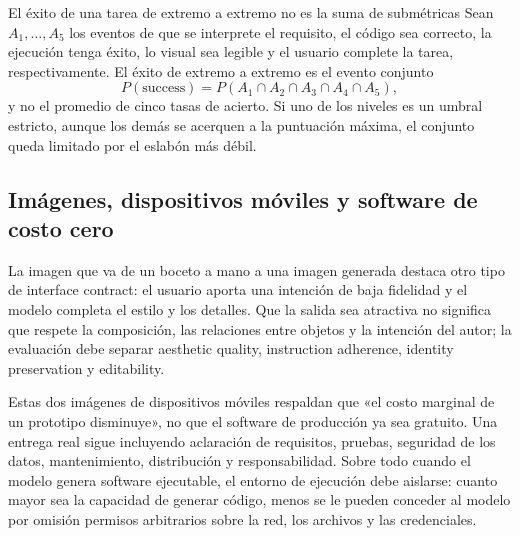 \begin{importantbox}{El éxito de una tarea de extremo a extremo no es la suma de submétricas}
Sean $A_1,\dots,A_5$ los eventos de que se interprete el requisito, el código sea correcto, la ejecución tenga éxito, lo visual sea legible y el usuario complete la tarea, respectivamente. El éxito de extremo a extremo es el evento conjunto
\[
P(\text{success})=P(A_1\cap A_2\cap A_3\cap A_4\cap A_5),
\]
y no el promedio de cinco tasas de acierto. Si uno de los niveles es un umbral estricto, aunque los demás se acerquen a la puntuación máxima, el conjunto queda limitado por el eslabón más débil.
\end{importantbox}

\subsection{Imágenes, dispositivos móviles y software de costo cero}

La imagen que va de un boceto a mano a una imagen generada destaca otro tipo de interface contract: el usuario aporta una intención de baja fidelidad y el modelo completa el estilo y los detalles. Que la salida sea atractiva no significa que respete la composición, las relaciones entre objetos y la intención del autor; la evaluación debe separar aesthetic quality, instruction adherence, identity preservation y editability.




Estas dos imágenes de dispositivos móviles respaldan que «el costo marginal de un prototipo disminuye», no que el software de producción ya sea gratuito. Una entrega real sigue incluyendo aclaración de requisitos, pruebas, seguridad de los datos, mantenimiento, distribución y responsabilidad. Sobre todo cuando el modelo genera software ejecutable, el entorno de ejecución debe aislarse: cuanto mayor sea la capacidad de generar código, menos se le pueden conceder al modelo por omisión permisos arbitrarios sobre la red, los archivos y las credenciales.

